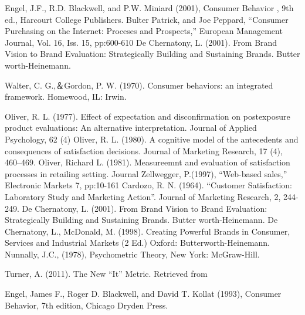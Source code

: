 \documentclass[a4paper,12pt]{report}
\begin{document}
\begin{thebibliography}{1}
Engel, J.F., R.D. Blackwell, and P.W. Miniard (2001), Consumer Behavior , 9th
ed., Harcourt College Publishers.
Bulter Patrick, and Joe Peppard, “Consumer Purchasing on the Internet: Proceses and Prospects,” European Management Journal, Vol. 16, Iss. 15, pp:600-610
De Chernatony, L. (2001). From Brand Vision to Brand Evaluation: Strategically Building and Sustaining Brands. Butter worth-Heinemann.

Walter, C. G.,＆Gordon, P. W. (1970). Consumer behaviors: an integrated framework. Homewood, IL: Irwin.

Oliver, R. L. (1977). Effect of expectation and disconfirmation on postexposure product
evaluations: An alternative interpretation. Journal of Applied Psychology, 62 (4)
Oliver, R. L. (1980). A cognitive model of the antecedents and consequences of satisfaction
decisions. Journal of Marketing Research, 17 (4), 460–469.
Oliver, Richard L. (1981). Measureemnt and evaluation of satisfaction processes in retailing setting. Journal
Zellwegger, P.(1997), “Web-based sales,” Electronic Markets 7, pp:10-161
Cardozo, R. N. (1964). “Customer Satisfaction: Laboratory Study and Marketing Action”. Journal of Marketing Research, 2, 244-249.
De Chernatony, L. (2001). From Brand Vision to Brand Evaluation: Strategically Building and Sustaining Brands. Butter worth-Heinemann.
De Chernatony, L., McDonald, M. (1998). Creating Powerful Brands in Consumer, Services and Industrial Markets (2 Ed.) Oxford: Butterworth-Heinemann.
Nunnally, J.C., (1978), Psychometric Theory, New York: McGraw-Hill. 

Turner, A. (2011). The New “It” Metric. Retrieved from

Engel, James F., Roger D. Blackwell, and David T. Kollat (1993), Consumer
Behavior, 7th edition, Chicago Dryden Press.


\end{thebibliography}
\end{document}
